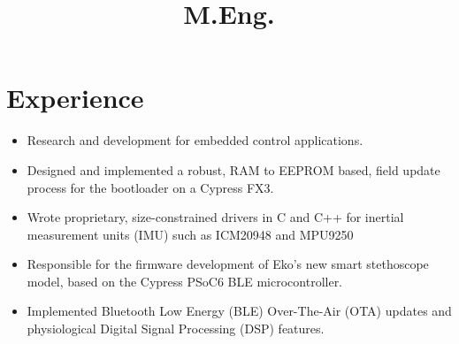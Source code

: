 \documentclass[11pt,letterpaper,sans]{moderncv}
\title{M.Eng.}                          %
\begin{document}
\makecvtitle
\vspace*{-15mm}
\small{ }
        
     \section{Experience}
     
        \vspace{-1pt}
        
        {
        \vspace{-1pt}
        \begin{itemize}
            \item Research and development for embedded control applications.
        \end{itemize}
        } 
        
        {
        \vspace{-1pt}
        \begin{itemize}
            \item Designed and implemented a robust, RAM to EEPROM based, field update process for the bootloader on a Cypress FX3.
            \item Wrote proprietary, size-constrained drivers in C and C++ for inertial measurement units (IMU) such as ICM20948 and MPU9250
        \end{itemize}
        } 
        
        \vspace{-1pt}
        {
        \vspace{-1pt}
        \begin{itemize}
            \item Responsible for the firmware development of Eko's new smart stethoscope model, based on the Cypress PSoC6 BLE microcontroller.
            \item Implemented Bluetooth Low Energy (BLE) Over-The-Air (OTA) updates and physiological Digital Signal Processing (DSP) features.
        \end{itemize}
        } 
        
\end{document}
